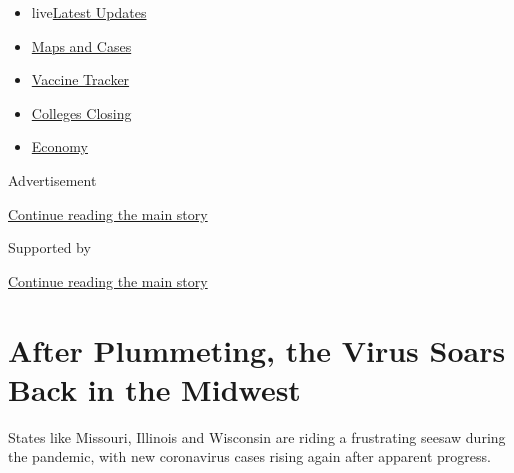 \begin{itemize}
\tightlist
\item
  live\href{https://www.nytimes3xbfgragh.onion/2020/08/21/world/covid-19-coronavirus.html?name=styln-coronavirus-national\&region=TOP_BANNER\&variant=undefined\&block=storyline_menu_recirc\&action=click\&pgtype=Article\&impression_id=8b2e2c41-e396-11ea-b4b7-bf9bf7f05dd6}{Latest
  Updates}
\item
  \href{https://www.nytimes3xbfgragh.onion/interactive/2020/us/coronavirus-us-cases.html?name=styln-coronavirus-national\&region=TOP_BANNER\&variant=undefined\&block=storyline_menu_recirc\&action=click\&pgtype=Article\&impression_id=8b2e5350-e396-11ea-b4b7-bf9bf7f05dd6}{Maps
  and Cases}
\item
  \href{https://www.nytimes3xbfgragh.onion/interactive/2020/science/coronavirus-vaccine-tracker.html?name=styln-coronavirus-national\&region=TOP_BANNER\&variant=undefined\&block=storyline_menu_recirc\&action=click\&pgtype=Article\&impression_id=8b2e5351-e396-11ea-b4b7-bf9bf7f05dd6}{Vaccine
  Tracker}
\item
  \href{https://www.nytimes3xbfgragh.onion/2020/08/19/us/colleges-closing-covid.html?name=styln-coronavirus-national\&region=TOP_BANNER\&variant=undefined\&block=storyline_menu_recirc\&action=click\&pgtype=Article\&impression_id=8b2e5352-e396-11ea-b4b7-bf9bf7f05dd6}{Colleges
  Closing}
\item
  \href{https://www.nytimes3xbfgragh.onion/live/2020/08/20/business/stock-market-today-coronavirus?name=styln-coronavirus-national\&region=TOP_BANNER\&variant=undefined\&block=storyline_menu_recirc\&action=click\&pgtype=Article\&impression_id=8b2e5353-e396-11ea-b4b7-bf9bf7f05dd6}{Economy}
\end{itemize}

Advertisement

\protect\hyperlink{after-top}{Continue reading the main story}

Supported by

\protect\hyperlink{after-sponsor}{Continue reading the main story}

\hypertarget{after-plummeting-the-virus-soars-back-in-the-midwest}{%
\section{After Plummeting, the Virus Soars Back in the
Midwest}\label{after-plummeting-the-virus-soars-back-in-the-midwest}}

States like Missouri, Illinois and Wisconsin are riding a frustrating
seesaw during the pandemic, with new coronavirus cases rising again
after apparent progress.

